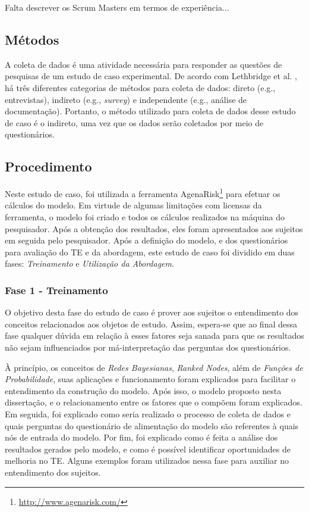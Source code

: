 {\color{red} Falta descrever os Scrum Masters em termos de experiência...}

\subsection{Métodos}
\label{estudodecaso:design:metodos}

A coleta de dados é uma atividade necessária para responder as questões de pesquisas de um estudo de caso experimental. De acordo com Lethbridge et al. \cite{}, há três diferentes categorias de métodos para coleta de dados: direto (e.g., entrevistas), indireto (e.g., \textit{survey}) e independente (e.g., análise de documentação). Portanto, o método utilizado para coleta de dados desse estudo de caso é o indireto, uma vez que os dados serão coletados por meio de questionários.

\subsection{Procedimento}
\label{estudodecaso:design:procedimento}

Neste estudo de caso, foi utilizada a ferramenta AgenaRisk\footnote{\url{http://www.agenarisk.com/}} para efetuar os cálculos do modelo. Em virtude de algumas limitações com licensas da ferramenta, o modelo foi criado e todos os cálculos realizados na máquina do pesquisador. Após a obtenção dos resultados, eles foram apresentados aos sujeitos em seguida pelo pesquisador. Após a definição do modelo, e dos questionários para avaliação do TE e da abordagem, este estudo de caso foi dividido em duas fases: \textit{Treinamento} e \textit{Utilização da Abordagem}.

\subsubsection{Fase 1 - Treinamento}
\label{estudodecaso:design:procedimento:treinamento}

O objetivo desta fase do estudo de caso é prover aos sujeitos o entendimento dos conceitos relacionados aos objetos de estudo. Assim, espera-se que ao final dessa fase qualquer dúvida em relação à esses fatores seja sanada para que os resultados não sejam influenciados por má-interpretação das perguntas dos questionários.

À princípio, os conceitos de \textit{Redes Bayesianas}, \textit{Ranked Nodes}, além de \textit{Funções de Probabilidade}, suas aplicações e funcionamento foram explicados para facilitar o entendimento da construção do modelo. Após isso, o modelo proposto nesta dissertação, e o relacionamento entre os fatores que o compõem foram explicados. Em seguida, foi explicado como seria realizado o processo de coleta de dados e quais perguntas do questionário de alimentação do modelo são referentes à quais nós de entrada do modelo. Por fim, foi explicado como é feita a análise dos resultados gerados pelo modelo, e como é possível identificar oportunidades de melhoria no TE. Alguns exemplos foram utilizados nessa fase para auxiliar no entendimento dos sujeitos.

